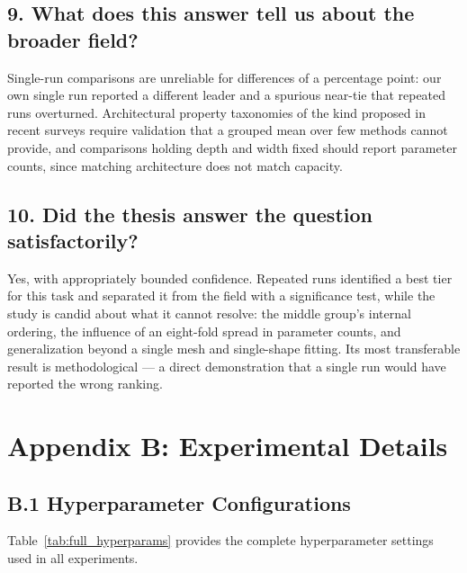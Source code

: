 \subsection*{9. What does this answer tell us about the broader field?}
Single-run comparisons are unreliable for differences of a percentage point: our own single run reported a different leader and a spurious near-tie that repeated runs overturned. Architectural property taxonomies of the kind proposed in recent surveys require validation that a grouped mean over few methods cannot provide, and comparisons holding depth and width fixed should report parameter counts, since matching architecture does not match capacity.

\subsection*{10. Did the thesis answer the question satisfactorily?}
Yes, with appropriately bounded confidence. Repeated runs identified a best tier for this task and separated it from the field with a significance test, while the study is candid about what it cannot resolve: the middle group's internal ordering, the influence of an eight-fold spread in parameter counts, and generalization beyond a single mesh and single-shape fitting. Its most transferable result is methodological --- a direct demonstration that a single run would have reported the wrong ranking.

\newpage

\section*{Appendix B: Experimental Details}

\subsection*{B.1 Hyperparameter Configurations}

Table~\ref{tab:full_hyperparams} provides the complete hyperparameter settings used in all experiments.

